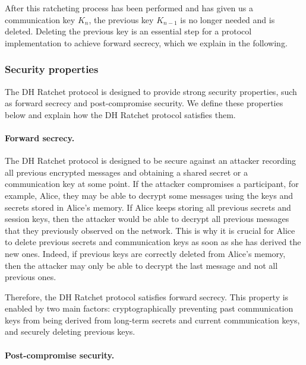After this ratcheting process has been performed and has given us a communication key $K_n$, the previous key $K_{n-1}$ is no longer needed and is deleted.
Deleting the previous key is an essential step for a protocol implementation to achieve forward secrecy, which we explain in the following.

\subsubsection{Security properties}
\label{sec:security-properties}

The DH Ratchet protocol is designed to provide strong security properties, such as forward secrecy and post-compromise security.
We define these properties below and explain how the DH Ratchet protocol satisfies them.

\paragraph{Forward secrecy.}
\label{sec:forward-secrecy}

The DH Ratchet protocol is designed to be secure against an attacker recording all previous encrypted messages and obtaining a shared secret or a communication key at some point.
If the attacker compromises a participant, for example, Alice, they may be able to decrypt some messages using the keys and secrets stored in Alice's memory. If Alice keeps storing all previous secrets and session keys, then the attacker would be able to decrypt all previous messages that they previously observed on the network. This is why it is crucial for Alice to delete previous secrets and communication keys as soon as she has derived the new ones.
Indeed, if previous keys are correctly deleted from Alice's memory, then the attacker may only be able to decrypt the last message and not all previous ones.

Therefore, the DH Ratchet protocol satisfies forward secrecy. This property is enabled by two main factors: cryptographically preventing past communication keys from being derived from long-term secrets and current communication keys, and securely deleting previous keys.

\paragraph{Post-compromise security.}
\label{sec:post-compromise-security}

